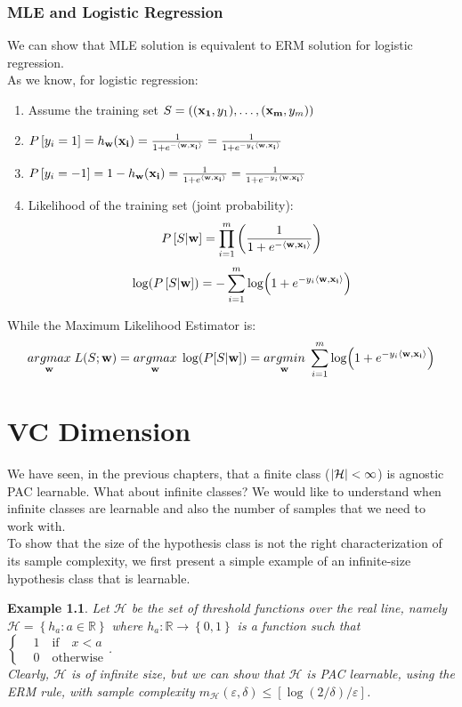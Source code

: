 \documentclass[12pt]{report}
\theoremstyle{plain}
\newtheorem{example}{Example}[chapter]
\newcommand\mcl[1]{\mathcal{#1}}
\newcommand\sprod[2]{\langle \vb{#1},\vb{#2}\rangle}
\begin{document}
\begin{flushleft}
\subsection{MLE and Logistic Regression}
We can show that MLE solution is equivalent to ERM solution for logistic 
regression.\\
As we know, for logistic regression:
\begin{enumerate}
	\item Assume the training set 
	$S=\left((\vb{x_1},y_1),\dots,(\vb{x_m},y_m)\right)$
	\item 
	$P\left[y_i=1\right]=h_{\vb{w}}(\vb{x_i})=\frac{1}{1+e^{-\sprod{w}{x_i}}}=\frac{1}{1+e^{-y_i\sprod{w}{x_i}}}$
	\item 	
	$P\left[y_i=-1\right]=1-h_{\vb{w}}(\vb{x_i})=\frac{1}{1+e^{\sprod{w}{x_i}}}=\frac{1}{1+e^{-y_i\sprod{w}{x_i}}}$
	\item Likelihood of the training set (joint probability):
	\[ P\left[S|\vb{w}\right]=\prod_{i=1}^m 
	\left(\frac{1}{1+e^{-\sprod{w}{x_i}}}\right) \]
	\[ \log(P\left[S|\vb{w}\right])=-\sum_{i=1}^m 
	\log(1+e^{-y_i\sprod{w}{x_i}}) 
	\]
\end{enumerate}
While the Maximum Likelihood Estimator is:
\[ \underset{\vb{w}}{argmax}\;L(S;\vb{w})=\underset{\vb{w}}{argmax}\; 
\log(P[S|\vb{w}])=\underset{\vb{w}}{argmin}\;\sum_{i=1}^m 
\log(1+e^{-y_i\sprod{w}{x_i}}) \]



\chapter{VC Dimension}
We have seen, in the previous chapters, that a finite class 
($\abs{\mcl{H}}<\infty$) is agnostic PAC learnable. What about infinite 
classes? We would like to understand when infinite classes are learnable and 
also the number of samples that we need to work with.\\ To show that the size 
of the hypothesis class is not the right characterization of its sample 
complexity, we first present a simple example of an infinite-size hypothesis 
class that is learnable.\\

\vspace{0.5cm}
\begin{example}
	Let $\mcl{H}$ be the set of \textit{threshold functions} over the real line, namely $\mcl{H}=\left\{h_a:a\in\mathds{R}\right\}$ where $h_a:\mathds{R}\to\left\{0,1\right\}$ is a function such that $\left\{\begin{aligned}&1\quad\text{if}\quad x<a\\&0\quad\text{otherwise}\end{aligned}\right.$.\\
	Clearly, $\mcl{H}$ is of infinite size, but we can show that $\mcl{H}$ is PAC learnable, using the ERM rule, with sample complexity $m_\mcl{H}(\varepsilon,\delta)\leq\left[\log(2/\delta)/\varepsilon\right]$.
	

\end{example}
\end{flushleft}
\end{document}
